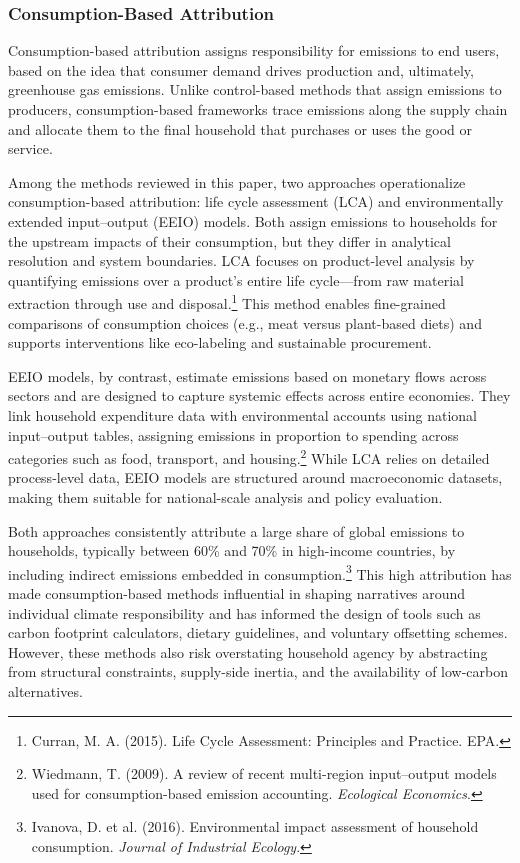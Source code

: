 \documentclass[12pt,a4paper]{article}%
\begin{document}
\subsubsection{Consumption-Based Attribution}

Consumption-based attribution assigns responsibility for emissions to end users, based on the idea that consumer demand drives production and, ultimately, greenhouse gas emissions. Unlike control-based methods that assign emissions to producers, consumption-based frameworks trace emissions along the supply chain and allocate them to the final household that purchases or uses the good or service.

Among the methods reviewed in this paper, two approaches operationalize consumption-based attribution: life cycle assessment (LCA) and environmentally extended input–output (EEIO) models. Both assign emissions to households for the upstream impacts of their consumption, but they differ in analytical resolution and system boundaries. LCA focuses on product-level analysis by quantifying emissions over a product’s entire life cycle—from raw material extraction through use and disposal.\footnote{Curran, M. A. (2015). Life Cycle Assessment: Principles and Practice. EPA.} This method enables fine-grained comparisons of consumption choices (e.g., meat versus plant-based diets) and supports interventions like eco-labeling and sustainable procurement.

EEIO models, by contrast, estimate emissions based on monetary flows across sectors and are designed to capture systemic effects across entire economies. They link household expenditure data with environmental accounts using national input–output tables, assigning emissions in proportion to spending across categories such as food, transport, and housing.\footnote{Wiedmann, T. (2009). A review of recent multi-region input–output models used for consumption-based emission accounting. \textit{Ecological Economics}.} While LCA relies on detailed process-level data, EEIO models are structured around macroeconomic datasets, making them suitable for national-scale analysis and policy evaluation.

Both approaches consistently attribute a large share of global emissions to households, typically between 60\% and 70\% in high-income countries, by including indirect emissions embedded in consumption.\footnote{Ivanova, D. et al. (2016). Environmental impact assessment of household consumption. \textit{Journal of Industrial Ecology}.} This high attribution has made consumption-based methods influential in shaping narratives around individual climate responsibility and has informed the design of tools such as carbon footprint calculators, dietary guidelines, and voluntary offsetting schemes. However, these methods also risk overstating household agency by abstracting from structural constraints, supply-side inertia, and the availability of low-carbon alternatives.
\end{document}
